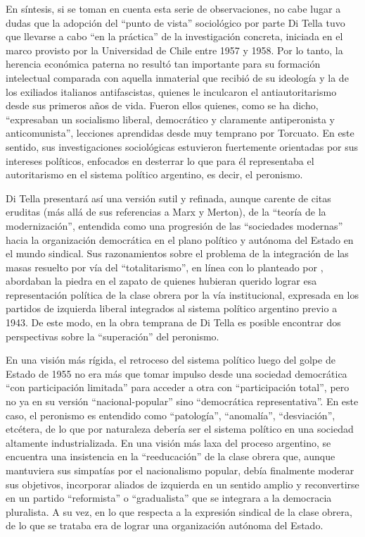 En síntesis, si se toman en cuenta esta serie de observaciones, no cabe lugar a dudas que la adopción del \enquote{punto de vista} sociológico por parte Di Tella tuvo que llevarse a cabo \enquote{en la práctica} de la investigación concreta, iniciada en el marco provisto por la Universidad de Chile entre 1957 y 1958. Por lo tanto, la herencia económica paterna no resultó tan importante para su formación intelectual comparada con aquella inmaterial que recibió de su ideología y la de los exiliados italianos antifascistas, quienes le inculcaron el antiautoritarismo desde sus primeros años de vida. Fueron ellos quienes, como se ha dicho, \enquote{expresaban un socialismo liberal, democrático y claramente antiperonista y anticomunista}, lecciones aprendidas desde muy temprano por Torcuato. En este sentido, sus investigaciones sociológicas estuvieron fuertemente orientadas por sus intereses políticos, enfocados en desterrar lo que para él representaba el autoritarismo en el sistema político argentino, es decir, el peronismo.

Di Tella presentará así una versión sutil y refinada, aunque carente de citas eruditas (más allá de sus referencias a Marx y Merton), de la \enquote{teoría de la modernización}, entendida como una progresión de las \enquote{sociedades modernas} hacia la organización democrática en el plano político y autónoma del Estado en el mundo sindical. Sus razonamientos sobre el problema de la integración de las masas resuelto por vía del \enquote{totalitarismo}, en línea con lo planteado por \textcite{1683-GERMANI1956}, abordaban la piedra en el zapato de quienes hubieran querido lograr esa representación política de la clase obrera por la vía institucional, expresada en los partidos de izquierda liberal integrados al sistema político argentino previo a 1943. De este modo, en la obra temprana de Di Tella es posible encontrar dos perspectivas sobre la \enquote{superación} del peronismo.

En una visión más rígida, el retroceso del sistema político luego del golpe de Estado de 1955 no era más que tomar impulso desde una sociedad democrática \enquote{con participación limitada} para acceder a otra con \enquote{participación total}, pero no ya en su versión \enquote{nacional-popular} sino \enquote{democrática representativa}. En este caso, el peronismo es entendido como \enquote{patología}, \enquote{anomalía}, \enquote{desviación}, etcétera, de lo que por naturaleza debería ser el sistema político en una sociedad altamente industrializada. En una visión más laxa del proceso argentino, se encuentra una insistencia en la \enquote{reeducación} de la clase obrera que, aunque mantuviera sus simpatías por el nacionalismo popular, debía finalmente moderar sus objetivos, incorporar aliados de izquierda en un sentido amplio y reconvertirse en un partido \enquote{reformista} o \enquote{gradualista} que se integrara a la democracia pluralista. A su vez, en lo que respecta a la expresión sindical de la clase obrera, de lo que se trataba era de lograr una organización autónoma del Estado.

